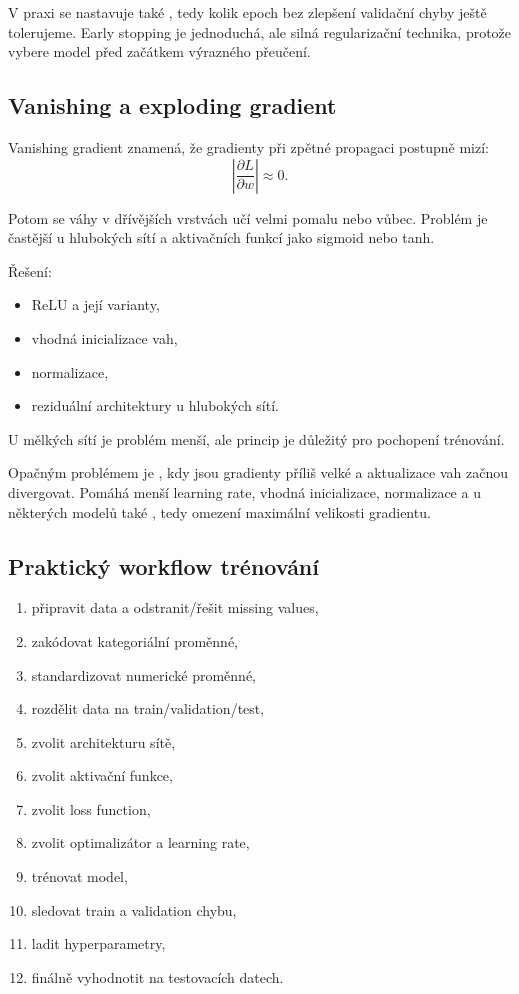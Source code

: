 V praxi se nastavuje také , tedy kolik epoch bez zlepšení validační chyby ještě tolerujeme.
Early stopping je jednoduchá, ale silná regularizační technika, protože vybere model před začátkem výrazného
přeučení.

\subsection{Vanishing a exploding gradient}

Vanishing gradient znamená, že gradienty při zpětné propagaci postupně mizí:
\[
\left|
\frac{\partial L}{\partial w}
\right|
\approx 0.
\]

Potom se váhy v dřívějších vrstvách učí velmi pomalu nebo vůbec. Problém je častější u hlubokých sítí a
aktivačních funkcí jako sigmoid nebo tanh.

Řešení:
\begin{itemize}
    \item ReLU a její varianty,
    \item vhodná inicializace vah,
    \item normalizace,
    \item reziduální architektury u hlubokých sítí.
\end{itemize}

U mělkých sítí je problém menší, ale princip je důležitý pro pochopení trénování.

Opačným problémem je , kdy jsou gradienty příliš velké a aktualizace vah začnou
divergovat. Pomáhá menší learning rate, vhodná inicializace, normalizace a u některých modelů také
, tedy omezení maximální velikosti gradientu.

\subsection{Praktický workflow trénování}

\begin{enumerate}
    \item připravit data a odstranit/řešit missing values,
    \item zakódovat kategoriální proměnné,
    \item standardizovat numerické proměnné,
    \item rozdělit data na train/validation/test,
    \item zvolit architekturu sítě,
    \item zvolit aktivační funkce,
    \item zvolit loss function,
    \item zvolit optimalizátor a learning rate,
    \item trénovat model,
    \item sledovat train a validation chybu,
    \item ladit hyperparametry,
    \item finálně vyhodnotit na testovacích datech.
\end{enumerate}

